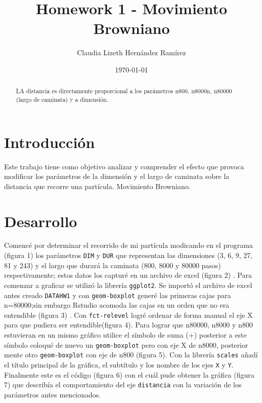 \documentclass{article}
\author{Claudia Lizeth Hern\'andez Ram\'irez} %
\title{Homework 1 - Movimiento Browniano} %
\date{\today}
\begin{document}

\maketitle %



\begin{abstract} %
  \centering
  LA distancia es directamente proporcional a los par\'ametros n800, n8000n, n80000 (largo de caminata) y a dimensi\'on.
\end{abstract}


\section{Introducci\'{o}n}\label{intro} %

Este trabajo tiene como objetivo analizar y comprender el efecto que provoca modificar los par\'ametros de la dimensi\'on y el largo de caminata sobre la distancia que recorre una part\'icula. Movimiento Browniano. 




\section{Desarrollo}\label{desarrollo} %

Comenc\'e por determinar el recorrido de mi part\'icula modicando en el programa (figura 1) \citep{DraElisa} los par\'ametros \texttt{DIM} y \texttt{DUR} que representan las dimensiones (3, 6, 9, 27, 81 y 243) y el largo que durar\'a la caminata (800, 8000 y 80000 pasos) respectivamente; estos datos los capturé en un archivo de excel (figura 2) \cite{excel}.
Para comenzar a graficar se utiliz\'o la librer\'ia \texttt{ggplot2}. \citep{ejemplo} \cite{ggplot}
Se import\'o el archivo de excel antes creado \texttt{DATAHW1} y con \texttt{geom-boxplot} \citep{geom}  gener\'e las primeras cajas para n=80000;sin embargo Rstudio acomoda las cajas en un orden que no era entendible (figura 3) \cite{primerintento} . Con \texttt{fct-relevel} \citep{fct} logr\'e ordenar de forma manual el eje X para que pudiera ser entendible(figura 4).
Para lograr que n80000, n8000 y n800 \citep{superponer} \cite{rggvideo} estuvieran en un mismo gr\'afico utilice el s\'imbolo de suma (+) posterior a este s\'imbolo coloqué de nuevo un \texttt{geom-boxplot} pero con eje X de n8000, posterior mente otro \texttt{geom-boxplot} con eje de n800 (figura 5).
Con la librer\'ia \texttt{scales} añad\'i el t\'itulo principal de la gr\'afica, el subt\'itulo y los nombre de los ejes \texttt{X} y \texttt{Y}.
Finalmente este es el c\'odigo (figura 6) con el cu\'al pude obtener la gr\'afica (figura 7) que describ\'ia el comportamiento del eje  \texttt{distancia} con la variaci\'on de los par\'ametros antes mencionados.
\end{document}
